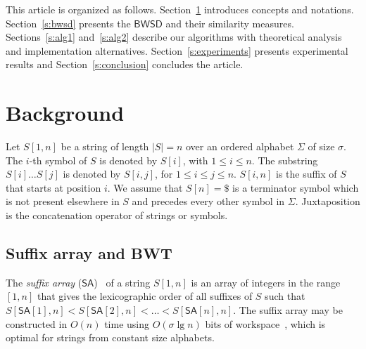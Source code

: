 \documentclass{elsarticle}
\newcommand{\SA}{\ensuremath{\mathsf{SA}}\xspace}
\newcommand{\BWSD}{\ensuremath{\mathsf{BWSD}}\xspace}
\begin{document}

This article is organized as follows.
Section~\ref{s:background} introduces concepts and notations.
Section~\ref{s:bwsd} presents the \BWSD and their similarity measures.
Sections~\ref{s:alg1} and~\ref{s:alg2} describe our algorithms
with theoretical analysis and implementation alternatives.
Section~\ref{s:experiments} presents experimental results and
Section~\ref{s:conclusion} concludes the article.



\section{Background}\label{s:background}


Let $S[1,n]$ be a string of length $|S|=n$ over an ordered alphabet
$\Sigma$ of size $\sigma$.  The $i$-th symbol of $S$ is denoted by $S[i]$,
with $1\leq i \leq n$.  The substring $S[i] \ldots S[j]$ is denoted by
$S[i,j]$, for $1\leq i \leq j\leq n$.  $S[i,n]$ is the suffix of $S$ that
starts at position $i$.  We assume that $S[n] = \$$ is a terminator symbol
which is not present elsewhere in $S$ and precedes every other symbol in
$\Sigma$.  Juxtaposition is the concatenation operator of strings or
symbols.

\subsection{Suffix array and BWT}

The {\em suffix array} (\SA)~\cite{Manber1993,Gonnet1992} of a string
$S[1,n]$ is an array of integers in the range $[1,n]$ that gives the
lexicographic order of all suffixes of $S$ such that $S[\SA[1], n] <
S[\SA[2], n] < \ldots < S[\SA[n], n]$.  The suffix array may be constructed
in $O(n)$ time using $O(\sigma \lg n)$ bits of workspace~\cite{Nong2013},
which is optimal for strings from constant size alphabets.

\end{document}
